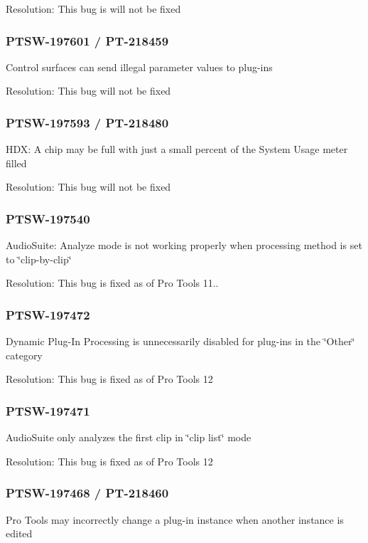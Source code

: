Resolution\+: This bug is will not be fixed\hypertarget{a00846_PTSW-197601}{}\subsubsection{P\+T\+S\+W-\/197601 / P\+T-\/218459}\label{a00846_PTSW-197601}
Control surfaces can send illegal parameter values to plug-\/ins

Resolution\+: This bug will not be fixed\hypertarget{a00846_PTSW-197593}{}\subsubsection{P\+T\+S\+W-\/197593 / P\+T-\/218480}\label{a00846_PTSW-197593}
H\+DX\+: A chip may be full with just a small percent of the System Usage meter filled

Resolution\+: This bug will not be fixed\hypertarget{a00846_PTSW-197540}{}\subsubsection{P\+T\+S\+W-\/197540}\label{a00846_PTSW-197540}
Audio\+Suite\+: Analyze mode is not working properly when processing method is set to \char`\"{}clip-\/by-\/clip\char`\"{}

Resolution\+: This bug is fixed as of Pro Tools 11..\hypertarget{a00846_PTSW-197472}{}\subsubsection{P\+T\+S\+W-\/197472}\label{a00846_PTSW-197472}
Dynamic Plug-\/\+In Processing is unnecessarily disabled for plug-\/ins in the \char`\"{}\+Other\char`\"{} category

Resolution\+: This bug is fixed as of Pro Tools 12\hypertarget{a00846_PTSW-197471}{}\subsubsection{P\+T\+S\+W-\/197471}\label{a00846_PTSW-197471}
Audio\+Suite only analyzes the first clip in \char`\"{}clip list\char`\"{} mode

Resolution\+: This bug is fixed as of Pro Tools 12\hypertarget{a00846_PTSW-197468}{}\subsubsection{P\+T\+S\+W-\/197468 / P\+T-\/218460}\label{a00846_PTSW-197468}
Pro Tools may incorrectly change a plug-\/in instance when another instance is edited


